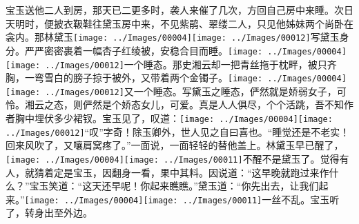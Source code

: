 宝玉送他二人到房，那天已二更多时，袭人来催了几次，方回自己房中来睡。次日天明时，便披衣靸鞋往黛玉房中来，不见紫鹃、翠缕二人，只见他姊妹两个尚卧在衾内。那林黛玉{\texttt{[image: ../Images/00004]}\texttt{[image: ../Images/00012]}\footnotesize \kaishu 写黛玉身分。}严严密密裹着一幅杏子红绫被，安稳合目而睡。{\texttt{[image: ../Images/00004]}\texttt{[image: ../Images/00012]}\footnotesize \kaishu 一个睡态。}那史湘云却一把青丝拖于枕畔，被只齐胸，一弯雪白的膀子掠于被外，又带着两个金镯子。{\texttt{[image: ../Images/00004]}\texttt{[image: ../Images/00012]}\footnotesize \kaishu 又一个睡态。写黛玉之睡态，俨然就是娇弱女子，可怜。湘云之态，则俨然是个娇态女儿，可爱。真是人人俱尽，个个活跳，吾不知作者胸中埋伏多少裙钗。}宝玉见了，叹道：{\texttt{[image: ../Images/00004]}\texttt{[image: ../Images/00012]}\footnotesize \kaishu ``叹''字奇！除玉卿外，世人见之自曰喜也。}``睡觉还是不老实！回来风吹了，又嚷肩窝疼了。''一面说，一面轻轻的替他盖上。林黛玉早已醒了，{\texttt{[image: ../Images/00004]}\texttt{[image: ../Images/00011]}\footnotesize \kaishu 不醒不是黛玉了。}觉得有人，就猜着定是宝玉，因翻身一看，果中其料。因说道：``这早晚就跑过来作什么？''宝玉笑道：``这天还早呢！你起来瞧瞧。''黛玉道：``你先出去，让我们起来。''{\texttt{[image: ../Images/00004]}\texttt{[image: ../Images/00011]}\footnotesize \kaishu 一丝不乱。}宝玉听了，转身出至外边。

